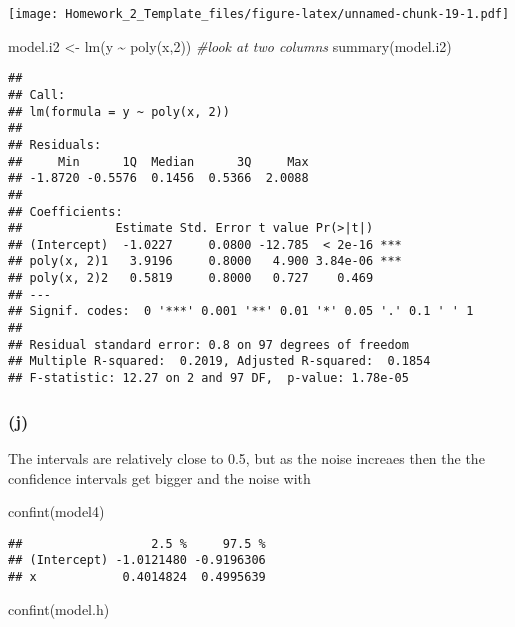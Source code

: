\documentclass[
]{article}
\newenvironment{Shaded}{\begin{snugshade}}{\end{snugshade}}
\newcommand{\CommentTok}[1]{\textcolor[rgb]{0.56,0.35,0.01}{\textit{#1}}}
\newcommand{\DecValTok}[1]{\textcolor[rgb]{0.00,0.00,0.81}{#1}}
\newcommand{\FunctionTok}[1]{\textcolor[rgb]{0.00,0.00,0.00}{#1}}
\newcommand{\NormalTok}[1]{#1}
\newcommand{\OtherTok}[1]{\textcolor[rgb]{0.56,0.35,0.01}{#1}}
\newcommand{\SpecialCharTok}[1]{\textcolor[rgb]{0.00,0.00,0.00}{#1}}
\begin{document}
\texttt{[image: Homework\_2\_Template\_files/figure-latex/unnamed-chunk-19-1.pdf]}

\begin{Shaded}
\begin{Highlighting}[]
\NormalTok{model.i2 }\OtherTok{\textless{}{-}} \FunctionTok{lm}\NormalTok{(y }\SpecialCharTok{\textasciitilde{}} \FunctionTok{poly}\NormalTok{(x,}\DecValTok{2}\NormalTok{)) }\CommentTok{\#look at two columns}
\FunctionTok{summary}\NormalTok{(model.i2)}
\end{Highlighting}
\end{Shaded}

\begin{verbatim}
## 
## Call:
## lm(formula = y ~ poly(x, 2))
## 
## Residuals:
##     Min      1Q  Median      3Q     Max 
## -1.8720 -0.5576  0.1456  0.5366  2.0088 
## 
## Coefficients:
##             Estimate Std. Error t value Pr(>|t|)    
## (Intercept)  -1.0227     0.0800 -12.785  < 2e-16 ***
## poly(x, 2)1   3.9196     0.8000   4.900 3.84e-06 ***
## poly(x, 2)2   0.5819     0.8000   0.727    0.469    
## ---
## Signif. codes:  0 '***' 0.001 '**' 0.01 '*' 0.05 '.' 0.1 ' ' 1
## 
## Residual standard error: 0.8 on 97 degrees of freedom
## Multiple R-squared:  0.2019, Adjusted R-squared:  0.1854 
## F-statistic: 12.27 on 2 and 97 DF,  p-value: 1.78e-05
\end{verbatim}

\hypertarget{j}{%
\subsubsection{(j)}\label{j}}

The intervals are relatively close to 0.5, but as the noise increaes
then the the confidence intervals get bigger and the noise with

\begin{Shaded}
\begin{Highlighting}[]
\FunctionTok{confint}\NormalTok{(model4)}
\end{Highlighting}
\end{Shaded}

\begin{verbatim}
##                  2.5 %     97.5 %
## (Intercept) -1.0121480 -0.9196306
## x            0.4014824  0.4995639
\end{verbatim}

\begin{Shaded}
\begin{Highlighting}[]
\FunctionTok{confint}\NormalTok{(model.h) }
\end{Highlighting}
\end{Shaded}
\end{document}
